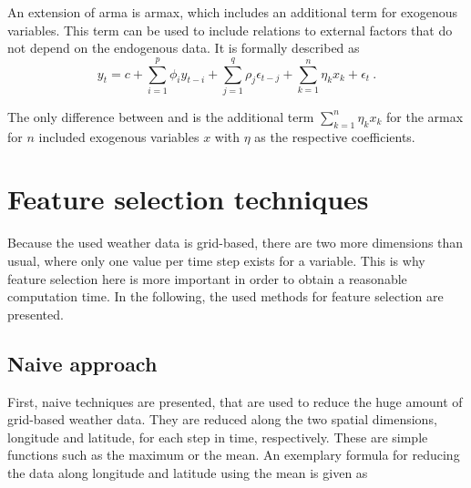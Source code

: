 An extension of \gls{arma} is \gls{armax}, which includes an additional term for exogenous variables. This term can be used to include relations to external factors that do not depend on the endogenous data. It is formally described as\\

\begin{equation}
y_t = c+\sum_{i=1}^{p}\phi_iy_{t-i}+\sum_{j=1}^{q}\rho_j\epsilon_{t-j}+\sum_{k=1}^{n}\eta_kx_k+\epsilon_t~.
\label{eq:armax}
\end{equation}

The only difference between  and  is the additional term $\sum_{k=1}^{n}\eta_kx_k$ for the \gls{armax} for $n$ included exogenous variables $x$ with $\eta$ as the respective coefficients.\\

%

\section{Feature selection techniques}
\label{sec:featsel}

Because the used weather data is grid-based, there are two more dimensions than usual, where only one value per time step exists for a variable. This is why feature selection here is more important in order to obtain a reasonable computation time. In the following, the used methods for feature selection are presented.\\

\subsection*{Naive approach}

First, naive techniques are presented, that are used to reduce the huge amount of grid-based weather data. They are reduced along the two spatial dimensions, longitude and latitude, for each step in time, respectively. These are simple functions such as the maximum or the mean. An exemplary formula for reducing the data along longitude and latitude using the mean is given as\\

